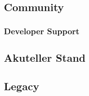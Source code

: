 \subsection{Community}
\subsubsection{Developer Support}

\subsection{Akuteller Stand}

\subsection{Legacy}
